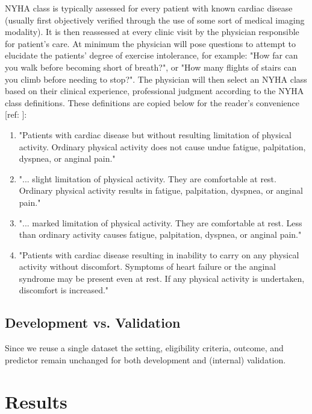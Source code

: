\documentclass[]{article}
\begin{document}
NYHA class is typically assessed for every patient with known cardiac disease (usually first objectively verified through the use of some sort of medical imaging modality). It is then reassessed at every clinic visit by the physician responsible for patient's care. At minimum the physician will pose questions to attempt to elucidate the patients' degree of exercise intolerance, for example: "How far can you walk before becoming short of breath?", or "How many flights of stairs can you climb before needing to stop?". The physician will then select an NYHA class based on their clinical experience, professional judgment according to the NYHA class definitions. These definitions are copied below for the reader's convenience [ref: ]:
\begin{enumerate}[label=\Roman{*}:]
	\item "Patients with cardiac disease but without resulting limitation of physical activity. Ordinary physical activity does not cause undue fatigue, palpitation, dyspnea, or anginal pain."
	\item "... slight limitation of physical activity. They are comfortable at rest. Ordinary physical activity results in fatigue, palpitation, dyspnea, or anginal pain."
	\item "... marked limitation of physical activity. They are comfortable at rest. Less than ordinary activity causes fatigue, palpitation, dyspnea, or anginal pain."
	\item "Patients with cardiac disease resulting in inability to carry on any physical activity without discomfort. Symptoms of heart failure or the anginal syndrome may be present even at rest. If any physical activity is undertaken, discomfort is increased."
\end{enumerate} 

\subsection{Development vs. Validation} %

Since we reuse a single dataset the setting, eligibility criteria, outcome, and predictor remain unchanged for both development and (internal) validation.

\section{Results}
\end{document}
